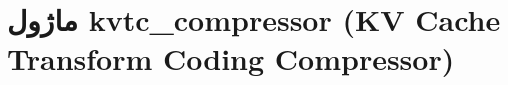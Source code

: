 \section{ماژول kvtc\_compressor (KV Cache Transform Coding Compressor)}
\label{sec:module_kvtc_compressor}
